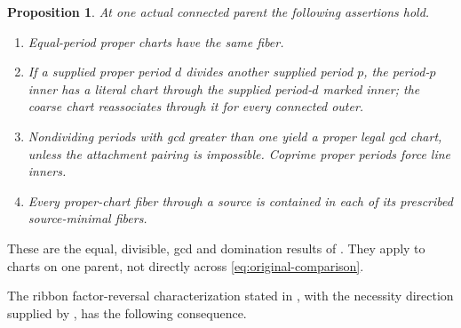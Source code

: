 \documentclass[11pt,a4paper]{amsart}
\numberwithin{equation}{section}
\theoremstyle{plain}
\newtheorem{proposition}[theorem]{Proposition}
\theoremstyle{definition}
\begin{document}
\begin{proposition}\label{prop:local-gluing}
At one actual connected parent the following assertions hold.
\begin{enumerate}
\item Equal-period proper charts have the same fiber.
\item If a supplied proper period \(d\) divides another supplied period \(p\), the
 period-\(p\) inner has a literal chart through the supplied period-\(d\) marked
 inner; the coarse chart reassociates through it for every connected outer.
\item Nondividing periods with gcd greater than one yield a proper legal gcd
 chart, unless the attachment pairing is impossible.  Coprime proper periods
 force line inners.
\item Every proper-chart fiber through a source is contained in each of its
 prescribed source-minimal fibers.
\end{enumerate}
\end{proposition}
These are the equal, divisible, gcd and domination results of
\cite{Shields2026Gluing}.  They apply to charts on one parent, not directly
across \eqref{eq:original-comparison}.

The ribbon factor-reversal characterization stated in
\cite[Cor.~4.2]{Billera2006DecomposableCompositions}, with the
necessity direction supplied by \cite{Shields2026Coarsenings},
has the following consequence.
\end{document}

